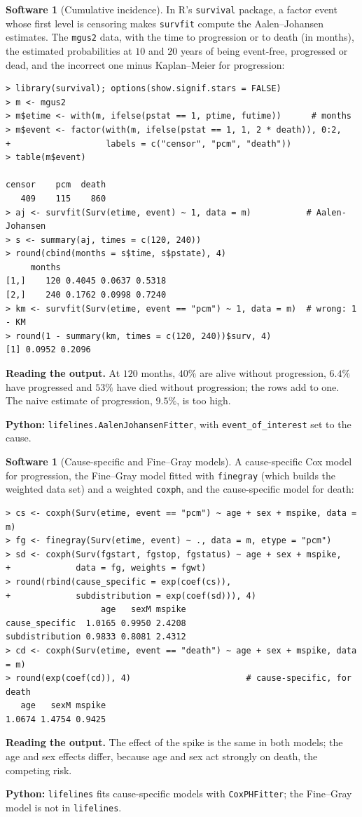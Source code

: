 \documentclass[11pt,a4paper]{article}
\numberwithin{equation}{section}
\theoremstyle{definition}
\newtheorem{software}[thm]{Software}
\begin{document}
\begin{software}[Cumulative incidence]
\label{sw:cif}
In R's \texttt{survival} package, a factor event whose first level is censoring makes \texttt{survfit} compute the Aalen--Johansen estimates. The \texttt{mgus2} data, with the time to progression or to death (in months), the estimated probabilities at $10$ and $20$ years of being event-free, progressed or dead, and the incorrect one minus Kaplan--Meier for progression:
{\small\begin{verbatim}
> library(survival); options(show.signif.stars = FALSE)
> m <- mgus2
> m$etime <- with(m, ifelse(pstat == 1, ptime, futime))      # months
> m$event <- factor(with(m, ifelse(pstat == 1, 1, 2 * death)), 0:2,
+                   labels = c("censor", "pcm", "death"))
> table(m$event)

censor    pcm  death 
   409    115    860 
> aj <- survfit(Surv(etime, event) ~ 1, data = m)           # Aalen-Johansen
> s <- summary(aj, times = c(120, 240))
> round(cbind(months = s$time, s$pstate), 4)
     months                     
[1,]    120 0.4045 0.0637 0.5318
[2,]    240 0.1762 0.0998 0.7240
> km <- survfit(Surv(etime, event == "pcm") ~ 1, data = m)  # wrong: 1 - KM
> round(1 - summary(km, times = c(120, 240))$surv, 4)
[1] 0.0952 0.2096
\end{verbatim}}
\textbf{Reading the output.} At $120$ months, $40\%$ are alive without progression, $6.4\%$ have progressed and $53\%$ have died without progression; the rows add to one. The naive estimate of progression, $9.5\%$, is too high.

\textbf{Python:} \texttt{lifelines.AalenJohansenFitter}, with \texttt{event\_of\_interest} set to the cause.
\end{software}

\begin{software}[Cause-specific and Fine--Gray models]
\label{sw:finegray}
A cause-specific Cox model for progression, the Fine--Gray model fitted with \texttt{finegray} (which builds the weighted data set) and a weighted \texttt{coxph}, and the cause-specific model for death:
{\small\begin{verbatim}
> cs <- coxph(Surv(etime, event == "pcm") ~ age + sex + mspike, data = m)
> fg <- finegray(Surv(etime, event) ~ ., data = m, etype = "pcm")
> sd <- coxph(Surv(fgstart, fgstop, fgstatus) ~ age + sex + mspike,
+             data = fg, weights = fgwt)
> round(rbind(cause_specific = exp(coef(cs)),
+             subdistribution = exp(coef(sd))), 4)
                   age   sexM mspike
cause_specific  1.0165 0.9950 2.4208
subdistribution 0.9833 0.8081 2.4312
> cd <- coxph(Surv(etime, event == "death") ~ age + sex + mspike, data = m)
> round(exp(coef(cd)), 4)                       # cause-specific, for death
   age   sexM mspike 
1.0674 1.4754 0.9425 
\end{verbatim}}
\textbf{Reading the output.} The effect of the spike is the same in both models; the age and sex effects differ, because age and sex act strongly on death, the competing risk.

\textbf{Python:} \texttt{lifelines} fits cause-specific models with \texttt{CoxPHFitter}; the Fine--Gray model is not in \texttt{lifelines}.
\end{software}
\end{document}
